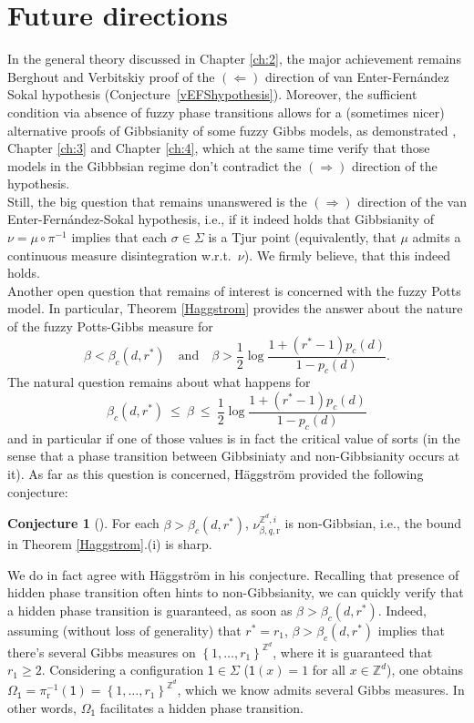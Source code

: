 \documentclass[12pt]{article}
\renewcommand{\r}{\mathrm{r}}
\newcommand{\Z}{\mathbb{Z}}
\newcommand{\set}[1]{\left\{#1\right\}}
\newcommand{\1}{\mathbbm{1}}
\newcommand{\5}{\vspace{0.5cm}}
\theoremstyle{definition}
\newtheorem{conj}[thm]{Conjecture}
\begin{document}

\section{Future directions}\label{ch:5}

In the general theory discussed in Chapter \ref{ch:2}, the major achievement remains Berghout and Verbitskiy proof of the $(\Leftarrow)$ direction of van Enter-Fern\'andez Sokal hypothesis (Conjecture~\ref{vEFShypothesis}). Moreover, the sufficient condition via absence of fuzzy phase transitions allows for a (sometimes nicer) alternative proofs of Gibbsianity of some fuzzy Gibbs models, as demonstrated \cite{Gas}, Chapter \ref{ch:3} and Chapter \ref{ch:4}, which at the same time verify that those models in the Gibbbsian regime don't contradict the $(\Rightarrow)$ direction of the hypothesis. \\

Still, the big question that remains unanswered is the $(\Rightarrow)$ direction of the van Enter-Fern\'andez-Sokal hypothesis, i.e., if it indeed holds that Gibbsianity of $\nu=\mu\circ\pi^{-1}$ implies that each $\sigma\in\Sigma$ is a Tjur point (equivalently, that $\mu$ admits a continuous measure disintegration w.r.t.~$\nu$). We firmly believe, that this indeed holds. \\

Another open question that remains of interest is concerned with the fuzzy Potts model. In particular, Theorem \ref{Haggstrom} provides the answer about the nature of the fuzzy Potts-Gibbs measure for
$$\beta < \beta_c(d,r^*) \quad \text{and} \quad \beta>\frac{1}{2}\log\frac{1+(r^*-1)p_c(d)}{1-p_c(d)}.$$
The natural question remains about what happens for
$$\beta_c(d,r^*) ~\leq~ \beta ~\leq~ \frac{1}{2}\log\frac{1+(r^*-1)p_c(d)}{1-p_c(d)}$$
and in particular if one of those values is in fact the critical value of sorts (in the sense that a phase transition between Gibbsiniaty and non-Gibbsianity occurs at it). As far as this question is concerned, H\"aggstr\"om provided the following conjecture:
\begin{conj}[\cite{Hag}]
For each $\beta>\beta_c(d,r^*)$, $\nu_{\beta,q,\r}^{\Z^d,i}$ is non-Gibbsian, i.e., the bound in Theorem \ref{Haggstrom}.(i) is sharp.
\end{conj}
We do in fact agree with H\"aggstr\"om in his conjecture. Recalling that presence of hidden phase transition often hints to non-Gibbsianity, we can quickly verify that a hidden phase transition is guaranteed, as soon as $\beta>\beta_c(d,r^*)$. Indeed, assuming (without loss of generality) that $r^*=r_1$, $\beta>\beta_c(d,r^*)$ implies that there's several Gibbs measures on $\set{1,\ldots,r_1}^{\Z^d}$, where it is guaranteed that $r_1\geq 2$. Considering a configuration $\mathsf{1}\in\Sigma$ ($\mathsf{1}(x)=1$ for all $x\in\Z^d$), one obtains $\Omega_{\mathsf{1}}=\pi_\r^{-1}(\mathsf{1})=\set{1,\ldots,r_1}^{\Z^d}$, which we know admits several Gibbs measures. In other words, $\Omega_{\mathsf{1}}$ facilitates a hidden phase transition. 
\end{document}
